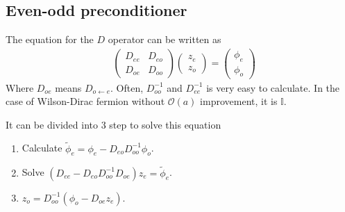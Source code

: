 \subsection{\label{sec:EvenOdd}Even-odd preconditioner}

The equation for the $D$ operator can be written as
\begin{equation}
\begin{split}
&\left(\begin{array}{cc}D_{ee} & D_{eo} \\ D_{oe} & D_{oo}\end{array}\right) \left(\begin{array}{c}z_e \\ z_o \end{array}\right)=\left(\begin{array}{c}\phi _e \\ \phi_o \end{array}\right)
\end{split}
\end{equation}
Where $D_{oe}$ means $D_{o\leftarrow e}$. Often, $D_{oo}^{-1}$ and $D_{ee}^{-1}$ is very easy to calculate. In the case of Wilson-Dirac fermion without $\mathcal{O}(a)$ improvement, it is $\mathbb{I}$.

It can be divided into 3 step to solve this equation
\begin{enumerate}
  \item Calculate $\tilde{\phi}_e = \phi _e - D_{eo}D_{oo}^{-1}\phi _o$.
  \item Solve $\left(D_{ee}- D_{eo}D_{oo}^{-1}D_{oe} \right) z_e = \tilde{\phi}_e$.
  \item $z_o = D_{oo}^{-1}(\phi _o -D_{oe}z_e)$.
\end{enumerate}

